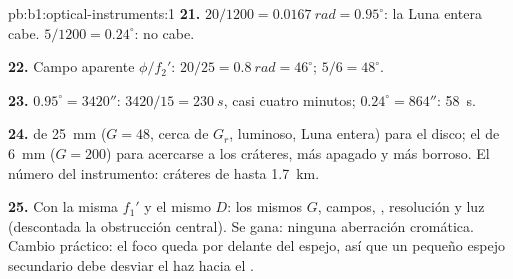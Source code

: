 \begin{solution}{pb:b1:optical-instruments:1}
\textbf{21.} $20/1200 = \qty{0.0167}{rad} = 0.95^\circ$: la Luna entera
cabe. $5/1200 = 0.24^\circ$: no cabe.

\textbf{22.} Campo aparente $\phi/f_2'$: $20/25 = \qty{0.8}{rad} = 46^\circ$;
$5/6 = 48^\circ$.

\textbf{23.} $0.95^\circ = 3420''$: $3420/15 = \qty{230}{s}$, casi cuatro
minutos; $0.24^\circ = 864''$: \qty{58}{s}.

\textbf{24.}  de \qty{25}{mm} ($G = 48$, cerca de $G_r$, luminoso,
Luna entera) para el disco; el de \qty{6}{mm} ($G = 200$) para acercarse a
los cráteres, más apagado y más borroso. El número del instrumento:
cráteres de hasta \qty{1.7}{km}.

\textbf{25.} Con la misma $f_1'$ y el mismo $D$: los mismos $G$, campos,
, resolución y luz (descontada la obstrucción central).
Se gana: ninguna aberración cromática. Cambio práctico: el foco queda por
delante del espejo, así que un pequeño espejo secundario debe desviar el
haz hacia el .
\end{solution}
